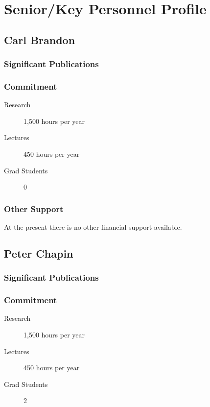 \section{Senior/Key Personnel Profile}
\subsection{Carl Brandon}

\subsubsection{Significant Publications}

\subsubsection{Commitment}
\begin{description}
\item[Research] 1,500 hours per year
\item[Lectures]   450 hours per year
\item[Grad Students] 0
\end{description}

\subsubsection{Other Support}
At the present there is no other financial support available.

\subsection{Peter Chapin}
%
\subsubsection{Significant Publications}

\subsubsection{Commitment}
\begin{description}
\item[Research] 1,500 hours per year
\item[Lectures]   450 hours per year
\item[Grad Students] 2
\end{description}

